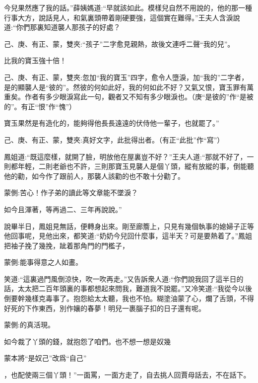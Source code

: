\begin{parag}
今兒果然應了我的話。”薛姨媽道:“早就該如此。模樣兒自然不用說的，他的那一種行事大方，說話見人，和氣裏頭帶着剛硬要強，這個實在難得。”王夫人含淚說道:“你們那裏知道襲人那孩子的好處？\begin{note}己、庚、有正、蒙，雙夾:“孩子”二字愈見親熱，故後文連呼二聲“我的兒”。\end{note}比我的寶玉強十倍！\begin{note}己、庚、有正、蒙，雙夾:忽加“我的寶玉”四字，愈令人墮淚，加“我的”二字者，是的顯襲人是“彼的”。然彼的何如此好，我的何如此不好？又氣又恨，寶玉罪有萬重矣。作者有多少眼淚寫此一句，觀者又不知有多少眼淚也。（庚“是彼的”作“是被的”。有正“恨”作“愧”）\end{note}寶玉果然是有造化的，能夠得他長長遠遠的伏侍他一輩子，也就罷了。”\begin{note}己、庚、有正、蒙，雙夾:真好文字，此批得出者。（有正“此批”作“寫”）\end{note}鳳姐道:“既這麼樣，就開了臉，明放他在屋裏豈不好？”王夫人道:“那就不好了，一則都年輕，二則老爺也不許，三則那寶玉見襲人是個丫頭，縱有放縱的事，倒能聽他的勸，如今作了跟前人，那襲人該勸的也不敢十分勸了。\begin{note}蒙側:苦心！作子弟的讀此等文章能不墜淚？\end{note}如今且渾著，等再過二、三年再說說。”
\end{parag}


\begin{parag}
    說畢半日，鳳姐見無話，便轉身出來。剛至廊簷上，只見有幾個執事的媳婦子正等他回事呢，見他出來，都笑道:“奶奶今兒回什麼事，這半天？可是要熱着了。”鳳姐把袖子挽了幾挽，跐着那角門的門檻子，\begin{note}蒙側:能事得意之人如畫。\end{note}笑道:“這裏過門風倒涼快，吹一吹再走。”又告訴衆人道:“你們說我回了這半日的話，太太把二百年頭裏的事都想起來問我，難道我不說罷。”又冷笑道:“我從今以後倒要幹幾樣克毒事了。抱怨給太太聽，我也不怕。糊塗油蒙了心，爛了舌頭，不得好死的下作東西，別作孃的春夢！明兒一裹腦子扣的日子還有呢。\begin{note}蒙側:的真活現。\end{note}如今裁了丫頭的錢，就抱怨了咱們。也不想一想是奴幾\begin{note}蒙本將“是奴己”改爲“自己”\end{note}，也配使兩三個丫頭！”一面罵，一面方走了，自去挑人回賈母話去，不在話下。
\end{parag}


